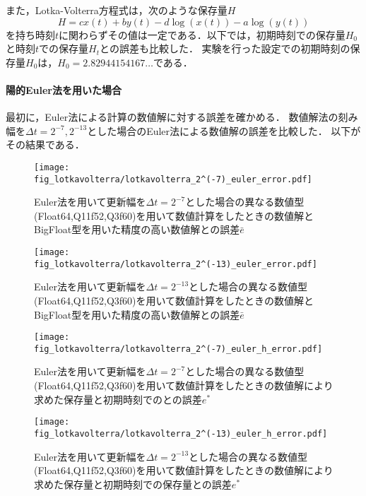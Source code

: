 また，Lotka-Volterra方程式は，次のような保存量$H$
\begin{equation}
    H = cx(t) + by(t) -d \log\left(x(t)\right) - a \log\left(y(t)\right)
\end{equation}
を持ち時刻$t$に関わらずその値は一定である．以下では，初期時刻での保存量$H_0$と時刻$t$での保存量$H_t$との誤差も比較した．
実験を行った設定での初期時刻の保存量$H_0$は，$H_0 =2.82944154167\dots$である．
\paragraph*{陽的Euler法を用いた場合}
最初に，Euler法による計算の数値解に対する誤差を確かめる．
数値解法の刻み幅を$\Delta t = 2^{-7},2^{-13}$とした場合のEuler法による数値解の誤差を比較した．
以下がその結果である．
\begin{figure}[H]
    \centering
    \begin{minipage}[b]{0.49\columnwidth}
        \centering
        \texttt{[image: fig\_lotkavolterra/lotkavolterra\_2^(-7)\_euler\_error.pdf]}
        \caption{Euler法を用いて更新幅を$\Delta t = 2^{-7}$とした場合の異なる数値型(Float64,Q11f52,Q3f60)を用いて数値計算をしたときの数値解とBigFloat型を用いた精度の高い数値解との誤差$\bar{e}$}
        \label{fig:lotkavolterra_2^(-7)_euler_error}
    \end{minipage}
    \begin{minipage}[b]{0.49\columnwidth}
        \centering
        \texttt{[image: fig\_lotkavolterra/lotkavolterra\_2^(-13)\_euler\_error.pdf]}
        \caption{Euler法を用いて更新幅を$\Delta t =  2^{-13}$とした場合の異なる数値型(Float64,Q11f52,Q3f60)を用いて数値計算をしたときの数値解とBigFloat型を用いた精度の高い数値解との誤差$\bar{e}$}
        \label{fig:lotkavolterra_2^(-13)_euler_error}
    \end{minipage}
\end{figure}
\begin{figure}[H]
    \centering
    \begin{minipage}[b]{0.49\columnwidth}
        \centering
        \texttt{[image: fig\_lotkavolterra/lotkavolterra\_2^(-7)\_euler\_h\_error.pdf]}
        \caption{Euler法を用いて更新幅を$\Delta t = 2^{-7}$とした場合の異なる数値型(Float64,Q11f52,Q3f60)を用いて数値計算をしたときの数値解により求めた保存量と初期時刻でのとの誤差$e^{\ast}$}
        \label{fig:lotkavolterra_2^(-7)_euler_h_error}
    \end{minipage}
    \begin{minipage}[b]{0.49\columnwidth}
        \centering
        \texttt{[image: fig\_lotkavolterra/lotkavolterra\_2^(-13)\_euler\_h\_error.pdf]}
        \caption{Euler法を用いて更新幅を$\Delta t =  2^{-13}$とした場合の異なる数値型(Float64,Q11f52,Q3f60)を用いて数値計算をしたときの数値解により求めた保存量と初期時刻での保存量との誤差$e^{\ast}$}
        \label{fig:lotkavolterra_2^(-13)_euler_h_error}
    \end{minipage}
\end{figure}

